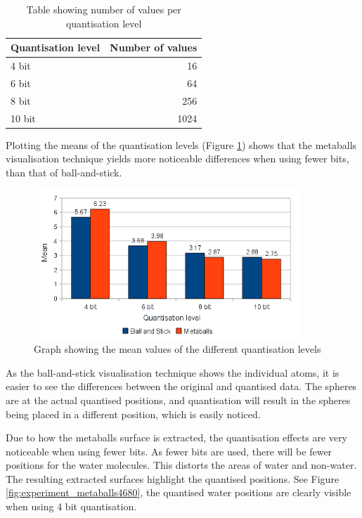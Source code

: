 \begin{table}
  \begin{tabular}{ | l | r | }
  \hline
  Quantisation level & Number of values  \\ \hline
  4 bit              &               16  \\ \hline
  6 bit              &               64  \\ \hline
  8 bit              &              256  \\ \hline
  10 bit             &             1024  \\ \hline
  \end{tabular}
  \caption{Table showing number of values per quantisation level}
  \label{tab:results_bitvalues}
\end{table}

Plotting the means of the quantisation levels (Figure
\ref{fig:results_bm_means}) shows that the metaballs visualisation technique
yields more noticeable differences when using fewer bits, than that of
ball-and-stick.

\begin{figure}
  \begin{center}
    \includegraphics[width=100mm]{bm_means}
  \end{center}
  \caption{Graph showing the mean values of the different quantisation levels}
  \label{fig:results_bm_means}
\end{figure}

As the ball-and-stick visualisation technique shows the individual atoms, it is
easier to see the differences between the original and quantised data. The
spheres are at the actual quantised positions, and quantisation will result in
the spheres being placed in a different position, which is easily noticed.

Due to how the metaballs surface is extracted, the quantisation effects are
very noticeable when using fewer bits. As fewer bits are used, there will be
fewer positions for the water molecules. This distorts the areas of water and
non-water. The resulting extracted surfaces highlight the quantised positions.
See Figure \ref{fig:experiment_metaballs4680}, the quantised water positions
are clearly visible when using 4 bit quantisation.

